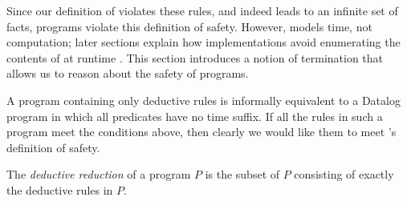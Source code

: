 
Since our definition of  violates these rules, and indeed
leads to an infinite set of facts, \slang programs violate this
definition of safety.  However,  models time, not computation;
later sections explain how \lang implementations avoid enumerating the contents
of  at runtime .  This section
introduces a notion of termination that allows us to reason about the safety of
\slang programs.


  



A \slang program containing only deductive rules is informally equivalent to a
Datalog program in which all predicates have no time suffix.  If all the rules
in such a program meet the conditions above, then clearly we would like them to meet \slang's definition of safety. 

\begin{definition} 
%
The \emph{deductive reduction} of a \slang program $P$ is
the subset of $P$ consisting of exactly the deductive rules in $P$.
%
\end{definition}

